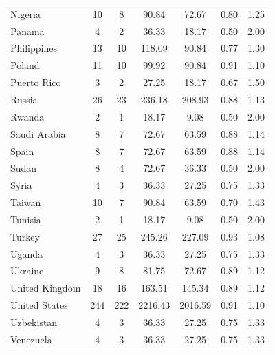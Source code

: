 \documentclass{article}
\theoremstyle{definition}
\begin{document}
\begin{table}[H]
\begin{tabular}{l|cccccc}
Nigeria &  10 &   8 & 90.84 & 72.67 & 0.80 & 1.25 \\
Panama &   4 &   2 & 36.33 & 18.17 & 0.50 & 2.00 \\
Philippines &  13 &  10 & 118.09 & 90.84 & 0.77 & 1.30 \\
Poland &  11 &  10 & 99.92 & 90.84 & 0.91 & 1.10 \\
Puerto Rico &   3 &   2 & 27.25 & 18.17 & 0.67 & 1.50 \\
Russia &  26 &  23 & 236.18 & 208.93 & 0.88 & 1.13 \\
Rwanda &   2 &   1 & 18.17 & 9.08 & 0.50 & 2.00 \\
Saudi Arabia &   8 &   7 & 72.67 & 63.59 & 0.88 & 1.14 \\
Spain &   8 &   7 & 72.67 & 63.59 & 0.88 & 1.14 \\
Sudan &   8 &   4 & 72.67 & 36.33 & 0.50 & 2.00 \\
Syria &   4 &   3 & 36.33 & 27.25 & 0.75 & 1.33 \\
Taiwan &  10 &   7 & 90.84 & 63.59 & 0.70 & 1.43 \\
Tunisia &   2 &   1 & 18.17 & 9.08 & 0.50 & 2.00 \\
Turkey &  27 &  25 & 245.26 & 227.09 & 0.93 & 1.08 \\
Uganda &   4 &   3 & 36.33 & 27.25 & 0.75 & 1.33 \\
Ukraine &   9 &   8 & 81.75 & 72.67 & 0.89 & 1.12 \\
United Kingdom &  18 &  16 & 163.51 & 145.34 & 0.89 & 1.12 \\
United States & 244 & 222 & 2216.43 & 2016.59 & 0.91 & 1.10 \\
Uzbekistan &   4 &   3 & 36.33 & 27.25 & 0.75 & 1.33 \\
Venezuela &   4 &   3 & 36.33 & 27.25 & 0.75 & 1.33 \\
\end{tabular}
\label{table:weights}
\end{table}
\end{document}
